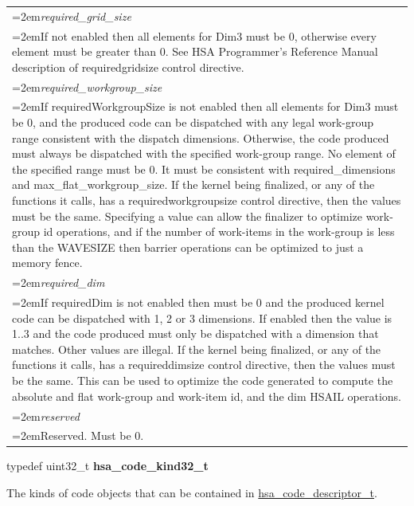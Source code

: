 \documentclass[final]{book}
\newcommand{\reffld}[1]{\textit{#1}}
\begin{document}
\begin{appendices}
\begin{longtable}{@{}>{\hangindent=2em}p{\textwidth}}
\reffld{required_grid_size}\\\hspace{2em}If not enabled then all elements for Dim3 must be 0, otherwise every element must be greater than 0. See HSA Programmer's Reference Manual description of requiredgridsize control directive.\\[2mm]
\reffld{required_workgroup_size}\\\hspace{2em}If requiredWorkgroupSize is not enabled then all elements for Dim3 must be 0, and the produced code can be dispatched with any legal work-group range consistent with the dispatch dimensions. Otherwise, the code produced must always be dispatched with the specified work-group range. No element of the specified range must be 0. It must be consistent with required_dimensions and max_flat_workgroup_size. If the kernel being finalized, or any of the functions it calls, has a requiredworkgroupsize control directive, then the values must be the same. Specifying a value can allow the finalizer to optimize work-group id operations, and if the number of work-items in the work-group is less than the WAVESIZE then barrier operations can be optimized to just a memory fence.\\[2mm]
\reffld{required_dim}\\\hspace{2em}If requiredDim is not enabled then must be 0 and the produced kernel code can be dispatched with 1, 2 or 3 dimensions. If enabled then the value is 1..3 and the code produced must only be dispatched with a dimension that matches. Other values are illegal. If the kernel being finalized, or any of the functions it calls, has a requireddimsize control directive, then the values must be the same. This can be used to optimize the code generated to compute the absolute and flat work-group and work-item id, and the dim HSAIL operations.\\[2mm]
\reffld{reserved}\\\hspace{2em}Reserved. Must be 0.
\end{longtable}



\noindent\begin{tcolorbox}[nobeforeafter,arc=0mm,colframe=white,colback=lightgray,left=0mm]
typedef uint32_t  \hypertarget{group--FinalizerCoreApi-1ga690737e41361fee5bcaa682650a7fc49}{\textbf{hsa_code_kind32_t}}
\end{tcolorbox}
The kinds of code objects that can be contained in \hyperlink{group--FinalizerCoreApi-1ga867c6b6dcaa193e321529590eb5df130}{hsa_code_descriptor_t}.
\\


\end{appendices}
\end{document}
